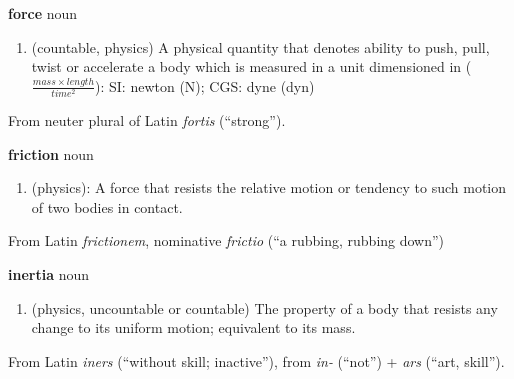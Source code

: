 \documentclass[
    DIV=12,
    BCOR=0mm,
    pagenumber=off,
    paper=11in:8.5in,
    pagesize,
]{scrartcl}
\begin{document}
\hfill\vfill
\begin{minipage}{\linewidth}
    \textbf{force}
     noun
    \begin{enumerate}
        \item (countable, physics) A physical quantity that denotes ability to push, pull, twist or accelerate a body which is measured in a unit dimensioned in ($\frac{mass\times{}length}{time^2}$): SI: newton (N); CGS: dyne (dyn)
    \end{enumerate}
    From neuter plural of Latin \emph{fortis} (``strong'').
\end{minipage}
\vfill
\newpage


\hfill\vfill
\begin{minipage}{\linewidth}
    \textbf{friction}
     noun
    \begin{enumerate}
        \item (physics): A force that resists the relative motion or tendency to such motion of two bodies in contact.
    \end{enumerate}
    From Latin \emph{frictionem}, nominative \emph{frictio} (``a rubbing, rubbing down'')
\end{minipage}
\vfill
\newpage


\hfill\vfill
\begin{minipage}{\linewidth}
    \textbf{inertia}
     noun
    \begin{enumerate}
        \item (physics, uncountable or countable) The property of a body that resists any change to its uniform motion; equivalent to its mass.
    \end{enumerate}
    From Latin \emph{iners} (``without skill; inactive''), from \emph{in-} (``not'') + \emph{ars} (``art, skill'').
\end{minipage}
\vfill
\newpage
\end{document}
